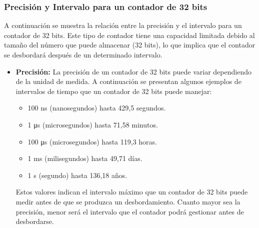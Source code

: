 \subsubsection{Precisión y Intervalo para un contador de 32 bits}

A continuación se muestra la relación entre la precisión y el intervalo para un contador de 32 bits. Este tipo de contador tiene una capacidad limitada debido al tamaño del número que puede almacenar (32 bits), lo que implica que el contador se desbordará después de un determinado intervalo.

\begin{itemize}
    \item \textbf{Precisión:} La precisión de un contador de 32 bits puede variar dependiendo de la unidad de medida. A continuación se presentan algunos ejemplos de intervalos de tiempo que un contador de 32 bits puede manejar:
    \begin{itemize}
        \item 100 ns (nanosegundos) hasta 429,5 segundos.
        \item 1 μs (microsegundos) hasta 71,58 minutos.
        \item 100 μs (microsegundos) hasta 119,3 horas.
        \item 1 ms (milisegundos) hasta 49,71 días.
        \item 1 s (segundo) hasta 136,18 años.
    \end{itemize}
    
    Estos valores indican el intervalo máximo que un contador de 32 bits puede medir antes de que se produzca un desbordamiento. Cuanto mayor sea la precisión, menor será el intervalo que el contador podrá gestionar antes de desbordarse.
\end{itemize}





